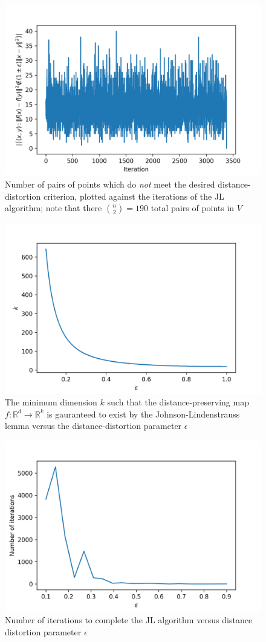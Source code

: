 \documentclass{article}
\begin{document}
\begin{figure}[H]
    \centering
    \includegraphics[width=.9\textwidth]{imgs/jl_iterations.png}
    \caption{Number of pairs of points which do \textit{not} meet the desired distance-distortion criterion, plotted against the iterations of the JL algorithm; note that there $\binom{n}{2} = 190$ total pairs of points in $V$}
\end{figure}

\begin{figure}[H]
    \centering
    \includegraphics[width=.75\textwidth]{imgs/jl_dim_subspace.png}
    \caption{The minimum dimension $k$ such that the distance-preserving map $f: \mathbb{R}^d \rightarrow \mathbb{R}^k$ is gauranteed to exist by the Johnson-Lindenstrauss lemma versus the distance-distortion parameter $\epsilon$}
\end{figure}

\begin{figure}[H]
    \centering
    \includegraphics[width=.75\textwidth]{imgs/jl_num_iterations.png}
    \caption{Number of iterations to complete the JL algorithm versus distance distortion parameter $\epsilon$}
\end{figure}
\end{document}
